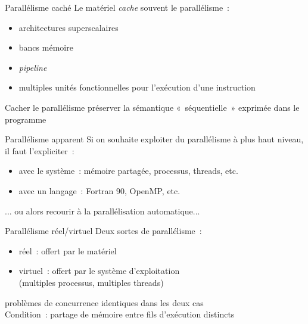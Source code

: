

\begin {frame} {Parallélisme caché}
    Le matériel \emph {cache} souvent le parallélisme~:

    \begin {itemize}
	\item architectures superscalaires
	\item bancs mémoire
	\item \emph {pipeline}
	\item multiples unités fonctionnelles pour l'exécution d'une
	    instruction
    \end {itemize}

    Cacher le parallélisme \implique préserver la sémantique
    «~séquentielle~» exprimée dans le programme

\end {frame}

\begin {frame} {Parallélisme apparent}
    Si on souhaite exploiter du parallélisme à plus haut niveau,
    il faut l'expliciter~:

    \begin {itemize}
	\item avec le système~: mémoire partagée, processus, threads, etc.
	\item avec un langage~: Fortran 90, OpenMP, etc.
    \end {itemize}

    ... ou alors recourir à la parallélisation automatique...
\end {frame}



\begin {frame} {Parallélisme réel/virtuel}
    Deux sortes de parallélisme~:
    \begin {itemize}
	\item réel~: offert par le matériel
	\item virtuel~: offert par le système d'exploitation \\
	    (multiples processus, multiples threads)
    \end {itemize}

    \vspace* {3mm}

    \implique problèmes de concurrence identiques dans les
    deux cas \\
    Condition~: partage de mémoire entre fils d'exécution distincts

\end {frame}
